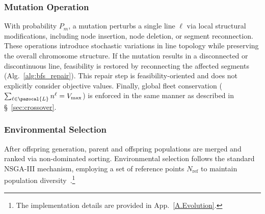 \documentclass[a4paper,fleqn]{cas-sc}
\begin{document}
\subsubsection{Mutation Operation}\label{sec:mutation}

With probability $P_m$, a mutation perturbs a single line $\ell$ via local structural modifications, including node insertion, node deletion, or segment reconnection.
These operations introduce stochastic variations in line topology while preserving the overall chromosome structure.
%
If the mutation results in a disconnected or discontinuous line,
feasibility is restored by reconnecting the affected segments (Alg.~\ref{alg:bfs_repair}).
This repair step is feasibility-oriented and does not explicitly consider objective values.
%
Finally, global fleet conservation ($\sum_{\ell\in\pazocal{L}} n^\ell = V_{\max}$)
is enforced in the same manner as described in \S~\ref{sec:crossover}.

\subsubsection{Environmental Selection}\label{sec:env_selection}
After offspring generation, parent and offspring populations are merged and ranked via non-dominated sorting.
%
Environmental selection follows the standard NSGA-III mechanism, employing a set of reference points $N_\text{ref}$ to maintain population diversity~\citep{deb2014nsga3}.\footnote{The implementation details are provided in App.~\ref{A.Evolution}.}


\end{document}
